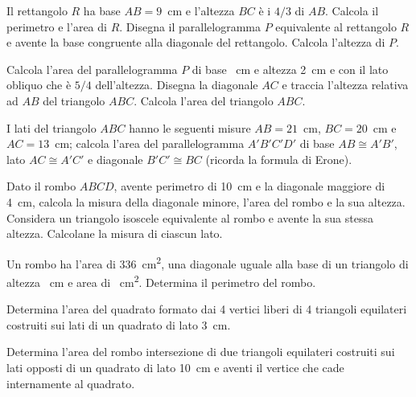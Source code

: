 \begin{multicols}{2}
\begin{esercizio}
\label{ese:7.48}
Il rettangolo \(R\) ha base \(AB = 9\)~cm e l'altezza \(BC\) è i \(4/3\) di 
\(AB\). Calcola il perimetro e l'area di \(R\). Disegna il 
parallelogramma \(P\) equivalente al rettangolo \(R\) e avente la base 
congruente alla diagonale del rettangolo. Calcola l'altezza di \(P\).
\end{esercizio}

\begin{esercizio}
\label{ese:7.49}
Calcola l'area del parallelogramma \(P\) di base ~cm e altezza 
2~cm e con il lato obliquo che è \(5/4\) dell'altezza. Disegna la 
diagonale \(AC\) e traccia l'altezza relativa ad \(AB\) del triangolo 
\(ABC\). Calcola l'area del triangolo \(ABC\).
\end{esercizio}

\begin{esercizio}
\label{ese:7.50}
I lati del triangolo \(ABC\) hanno le seguenti misure \(AB=21\)~cm, 
\(BC=20\)~cm e \(AC=13\)~cm; calcola l'area del parallelogramma 
\(A'B'C'D'\) di base \(AB\cong A'B'\), lato \(AC\cong A'C'\) e diagonale 
\(B'C'\cong BC\) (ricorda la formula di Erone).
\end{esercizio}

\begin{esercizio}
\label{ese:7.51}
Dato il rombo \(ABCD\), avente perimetro di 10~cm e la diagonale 
maggiore di 4~cm, calcola la misura della diagonale minore, l'area 
del rombo e la sua altezza. Considera un triangolo isoscele 
equivalente al rombo e avente la sua stessa altezza. Calcolane la 
misura di ciascun lato.
\end{esercizio}

\begin{esercizio}
\label{ese:7.52}
Un rombo ha l'area di 336~cm\textsuperscript{2}, una diagonale uguale 
alla base di un triangolo di altezza ~cm e area di 
~cm\textsuperscript{2}. Determina il perimetro del rombo.
\end{esercizio}

\begin{esercizio}
\label{ese:7.53}
Determina l'area del quadrato formato dai 4 vertici liberi di 4 
triangoli equilateri costruiti sui lati di un quadrato di lato 3~cm.
\end{esercizio}

\begin{esercizio}
\label{ese:7.54}
Determina l'area del rombo intersezione di due triangoli equilateri 
costruiti sui lati opposti di un quadrato di lato 10~cm e aventi il 
vertice che cade internamente al quadrato.
\end{esercizio}


\end{multicols}
